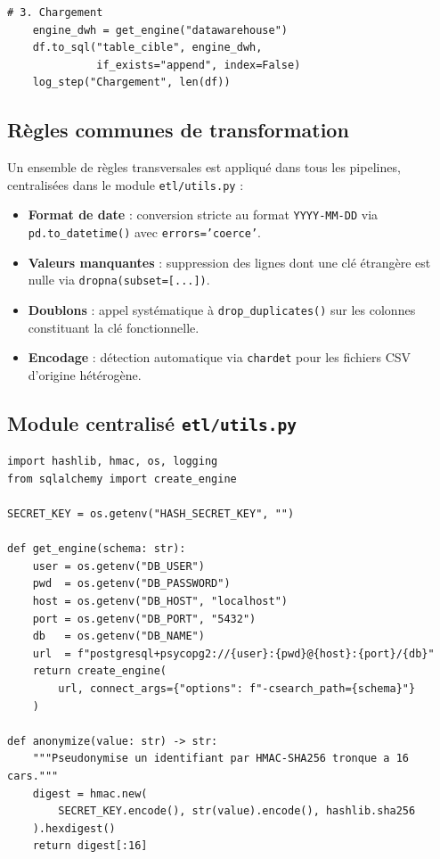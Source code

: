 \documentclass[12pt, a4paper]{report}
\begin{document}
\begin{itemize}[label=\textcolor{chuBlue}{\textbullet}]
\begin{lstlisting}[style=python, caption={Structure type d'un pipeline ETL}, label={lst:etl_structure}]
    # 3. Chargement
    engine_dwh = get_engine("datawarehouse")
    df.to_sql("table_cible", engine_dwh,
              if_exists="append", index=False)
    log_step("Chargement", len(df))
\end{lstlisting}

\subsection{Règles communes de transformation}

Un ensemble de règles transversales est appliqué dans tous les pipelines, centralisées dans le module \texttt{etl/utils.py} :

\begin{itemize}[label=\textcolor{chuBlue}{\textbullet}]
  \item \textbf{Format de date} : conversion stricte au format \texttt{YYYY-MM-DD} via \texttt{pd.to\_datetime()} avec \texttt{errors='coerce'}.
  \item \textbf{Valeurs manquantes} : suppression des lignes dont une clé étrangère est nulle via \texttt{dropna(subset=[...])}.
  \item \textbf{Doublons} : appel systématique à \texttt{drop\_duplicates()} sur les colonnes constituant la clé fonctionnelle.
  \item \textbf{Encodage} : détection automatique via \texttt{chardet} pour les fichiers CSV d'origine hétérogène.
\end{itemize}

\subsection{Module centralisé \texttt{etl/utils.py}}

\begin{lstlisting}[style=python, caption={Module utilitaire centralisé \texttt{etl/utils.py}}, label={lst:utils}]
import hashlib, hmac, os, logging
from sqlalchemy import create_engine

SECRET_KEY = os.getenv("HASH_SECRET_KEY", "")

def get_engine(schema: str):
    user = os.getenv("DB_USER")
    pwd  = os.getenv("DB_PASSWORD")
    host = os.getenv("DB_HOST", "localhost")
    port = os.getenv("DB_PORT", "5432")
    db   = os.getenv("DB_NAME")
    url  = f"postgresql+psycopg2://{user}:{pwd}@{host}:{port}/{db}"
    return create_engine(
        url, connect_args={"options": f"-csearch_path={schema}"}
    )

def anonymize(value: str) -> str:
    """Pseudonymise un identifiant par HMAC-SHA256 tronque a 16 cars."""
    digest = hmac.new(
        SECRET_KEY.encode(), str(value).encode(), hashlib.sha256
    ).hexdigest()
    return digest[:16]


\end{lstlisting}
\end{itemize}
\end{document}
